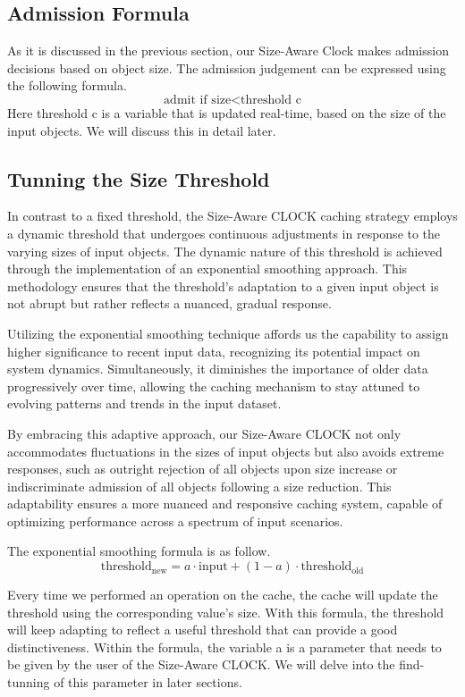 \documentclass[conference]{IEEEtran}
\begin{document}
\subsection{Admission Formula}
As it is discussed in the previous section, our Size-Aware Clock makes admission decisions based on object size. The admission judgement can be expressed using the following formula.
\[
\text{admit if } \text{size} < \text{threshold} \text{ c}
\]
Here threshold c is a variable that is updated real-time, based on the size of the input objects. We will discuss this in detail later.

\subsection{Tunning the Size Threshold}
In contrast to a fixed threshold, the Size-Aware CLOCK caching strategy employs a dynamic threshold that undergoes continuous adjustments in response to the varying sizes of input objects. The dynamic nature of this threshold is achieved through the implementation of an exponential smoothing approach. This methodology ensures that the threshold's adaptation to a given input object is not abrupt but rather reflects a nuanced, gradual response.

Utilizing the exponential smoothing technique affords us the capability to assign higher significance to recent input data, recognizing its potential impact on system dynamics. Simultaneously, it diminishes the importance of older data progressively over time, allowing the caching mechanism to stay attuned to evolving patterns and trends in the input dataset.

By embracing this adaptive approach, our Size-Aware CLOCK not only accommodates fluctuations in the sizes of input objects but also avoids extreme responses, such as outright rejection of all objects upon size increase or indiscriminate admission of all objects following a size reduction. This adaptability ensures a more nuanced and responsive caching system, capable of optimizing performance across a spectrum of input scenarios. 

The exponential smoothing formula is as follow.
\[
\text{threshold}_{\text{new}} = a \cdot \text{input} + (1 - a) \cdot \text{threshold}_{\text{old}}
\]

Every time we performed an operation on the cache, the cache will update the threshold using the corresponding value's size. With this formula, the threshold will keep adapting to reflect a useful threshold that can provide a good distinctiveness.
Within the formula, the variable a is a parameter that needs to be given by the user of the Size-Aware CLOCK. We will delve into the find-tunning of this parameter in later sections.
\end{document}
